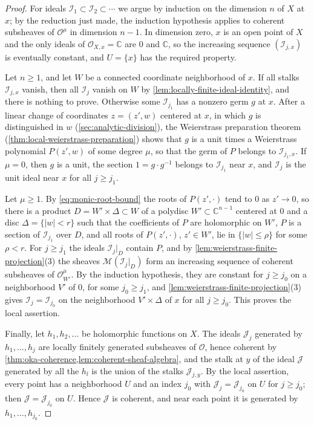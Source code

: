 \begin{proof}
For ideals $\mathcal I_1\subset\mathcal I_2\subset\cdots$ we argue by induction on the dimension $n$ of $X$ at $x$; by the reduction just made, the induction hypothesis applies to coherent subsheaves of $\mathcal O^\mu$ in dimension $n-1$. In dimension zero, $x$ is an open point of $X$ and the only ideals of $\mathcal O_{X,x}=\mathbb C$ are $0$ and $\mathbb C$, so the increasing sequence $(\mathcal I_{j,x})$ is eventually constant, and $U=\{x\}$ has the required property.

Let $n\geq1$, and let $W$ be a connected coordinate neighborhood of $x$. If all stalks $\mathcal I_{j,x}$ vanish, then all $\mathcal I_j$ vanish on $W$ by \cref{lem:locally-finite-ideal-identity}, and there is nothing to prove. Otherwise some $\mathcal I_{j_1}$ has a nonzero germ $g$ at $x$. After a linear change of coordinates $z=(z',w)$ centered at $x$, in which $g$ is distinguished in $w$ (\cref{sec:analytic-division}), the Weierstrass preparation theorem (\cref{thm:local-weierstrass-preparation}) shows that $g$ is a unit times a Weierstrass polynomial $P(z',w)$ of some degree $\mu$, so that the germ of $P$ belongs to $\mathcal I_{j_1,x}$. If $\mu=0$, then $g$ is a unit, the section $1=g\cdot g^{-1}$ belongs to $\mathcal I_{j_1}$ near $x$, and $\mathcal I_j$ is the unit ideal near $x$ for all $j\geq j_1$.

Let $\mu\geq1$. By \eqref{eq:monic-root-bound} the roots of $P(z',\cdot)$ tend to $0$ as $z'\to0$, so there is a product $D=W'\times\Delta\subset W$ of a polydisc $W'\subset\mathbb C^{n-1}$ centered at $0$ and a disc $\Delta=\{|w|<r\}$ such that the coefficients of $P$ are holomorphic on $W'$, $P$ is a section of $\mathcal I_{j_1}$ over $D$, and all roots of $P(z',\cdot)$, $z'\in W'$, lie in $\{|w|\leq\rho\}$ for some $\rho<r$. For $j\geq j_1$ the ideals $\mathcal I_j|_D$ contain $P$, and by \cref{lem:weierstrass-finite-projection}(3) the sheaves $\mathcal M(\mathcal I_j|_D)$ form an increasing sequence of coherent subsheaves of $\mathcal O_{W'}^\mu$. By the induction hypothesis, they are constant for $j\geq j_0$ on a neighborhood $V'$ of $0$, for some $j_0\geq j_1$, and \cref{lem:weierstrass-finite-projection}(3) gives $\mathcal I_j=\mathcal I_{j_0}$ on the neighborhood $V'\times\Delta$ of $x$ for all $j\geq j_0$. This proves the local assertion.

Finally, let $h_1,h_2,\ldots$ be holomorphic functions on $X$. The ideals $\mathcal J_j$ generated by $h_1,\ldots,h_j$ are locally finitely generated subsheaves of $\mathcal O$, hence coherent by \cref{thm:oka-coherence,lem:coherent-sheaf-algebra}, and the stalk at $y$ of the ideal $\mathcal J$ generated by all the $h_l$ is the union of the stalks $\mathcal J_{j,y}$. By the local assertion, every point has a neighborhood $U$ and an index $j_0$ with $\mathcal J_j=\mathcal J_{j_0}$ on $U$ for $j\geq j_0$; then $\mathcal J=\mathcal J_{j_0}$ on $U$. Hence $\mathcal J$ is coherent, and near each point it is generated by $h_1,\ldots,h_{j_0}$.
\end{proof}

